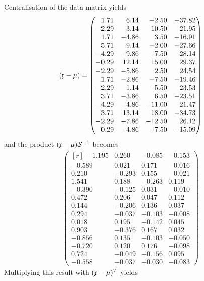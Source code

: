 \begin{refsection}
Centralisation of the data matrix yields
\begin{gather} (\AbsVec{x} - \mu) =
  \begin{pmatrix*}[r]
     1.71 &  6.14 &  -2.50 & -37.82 \\
    -2.29 &  3.14 &  10.50 &  21.95 \\
     1.71 & -4.86 &   3.50 & -16.91 \\
     5.71 &  9.14 &  -2.00 & -27.66 \\
    -4.29 & -9.86 &  -7.50 &  28.14 \\
    -0.29 & 12.14 &  15.00 &  29.37 \\
    -2.29 & -5.86 &   2.50 &  24.54 \\
     1.71 & -2.86 &  -7.50 & -19.46 \\
    -2.29 &  1.14 &  -5.50 &  23.53 \\
     3.71 & -3.86 &   6.50 & -23.51 \\
    -4.29 & -4.86 & -11.00 &  21.47 \\
     3.71 & 13.14 &  18.00 & -34.73 \\
    -2.29 & -7.86 & -12.50 &  26.12 \\
    -0.29 & -4.86 &  -7.50 & -15.09
  \end{pmatrix*}
\end{gather}
and the product \((\mathfrak{x} - \mu) \mathcal{S}^{-1} \) becomes
\begin{gather}
  \begin{pmatrix*}[r]
    -1.195 &  0.260 & -0.085 & -0.153 \\
    -0.589 &  0.021 &  0.171 & -0.016 \\
     0.210 & -0.293 &  0.155 & -0.021 \\
     1.541 &  0.188 & -0.263 &  0.119 \\
    -0.390 & -0.125 &  0.031 & -0.010 \\
     0.472 &  0.206 &  0.047 &  0.112 \\
     0.144 & -0.206 &  0.136 &  0.037 \\
     0.294 & -0.037 & -0.103 & -0.008 \\
     0.018 &  0.195 & -0.142 &  0.045 \\
     0.903 & -0.376 &  0.167 &  0.032 \\
    -0.856 &  0.135 & -0.103 & -0.050 \\
    -0.720 &  0.120 &  0.176 & -0.098 \\
     0.724 & -0.049 & -0.156 &  0.095 \\
    -0.558 & -0.037 & -0.030 & -0.083
  \end{pmatrix*}
\end{gather}
Multiplying this result with \((\mathfrak{x} - \mu)^T \) yields


\end{refsection}
